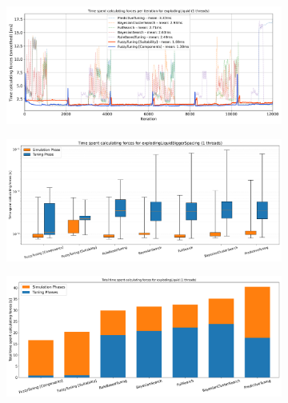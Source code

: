 \begin{figure}[H]
    \centering

    \begin{subfigure}[c]{\textwidth}
        \includegraphics[width=\columnwidth,trim={0cm 0cm 0cm 0.9cm},clip]{figures/Benchmark/ExplodingLiquid/timing_explodingLiquid_1.png}
        \caption{}
        \label{fig:explodingTimings_1thread}
    \end{subfigure}


    \begin{subfigure}[c]{\textwidth}
        \includegraphics[width=\columnwidth,trim={0cm 0.5cm 0cm 1cm},clip]{figures/Benchmark/ExplodingLiquid/boxplot_explodingLiquid_1.png}
        \caption{}
        \label{fig:explodingLiquidBoxplot_1thread}
    \end{subfigure}

    \begin{subfigure}[b]{\textwidth}
        \includegraphics[width=\columnwidth,trim={0cm 0.5cm 0cm 0.9cm},clip]{figures/Benchmark/ExplodingLiquid/total_time_explodingLiquid_1.png}
        \caption{}
        \label{fig:explodingLiquidTotalTime_1thread}
    \end{subfigure}



\end{figure}
